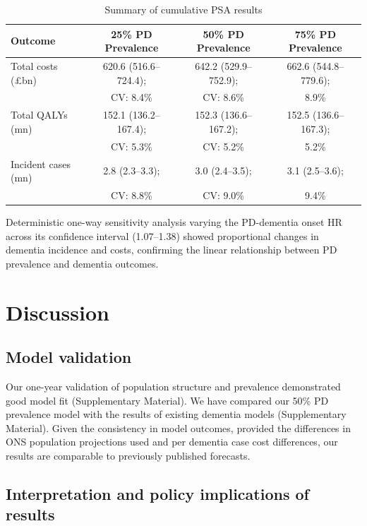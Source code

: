 \documentclass[11pt,a4paper]{article}
\begin{document}
\begin{table}[htbp]
\centering
\caption{Summary of cumulative PSA results}
\label{tab:psa}
\small
\begin{tabular}{lccc}
\toprule
\textbf{Outcome} & \textbf{25\% PD Prevalence} & \textbf{50\% PD Prevalence} & \textbf{75\% PD Prevalence} \\
\midrule
Total costs (\pounds bn) & 620.6 (516.6--724.4); & 642.2 (529.9--752.9); & 662.6 (544.8--779.6); \\
 & CV: 8.4\% & CV: 8.6\% & 8.9\% \\
Total QALYs (mn) & 152.1 (136.2--167.4); & 152.3 (136.6--167.2); & 152.5 (136.6--167.3); \\
 & CV: 5.3\% & CV: 5.2\% & 5.2\% \\
Incident cases (mn) & 2.8 (2.3--3.3); & 3.0 (2.4--3.5); & 3.1 (2.5--3.6); \\
 & CV: 8.8\% & CV: 9.0\% & 9.4\% \\
\bottomrule
\end{tabular}
\end{table}

Deterministic one-way sensitivity analysis varying the PD-dementia onset HR across its confidence interval (1.07--1.38) showed proportional changes in dementia incidence and costs, confirming the linear relationship between PD prevalence and dementia outcomes.

\section{Discussion}

\subsection{Model validation}

Our one-year validation of population structure and prevalence demonstrated good model fit (Supplementary Material). We have compared our 50\% PD prevalence model with the results of existing dementia models (Supplementary Material). Given the consistency in model outcomes, provided the differences in ONS population projections used and per dementia case cost differences, our results are comparable to previously published forecasts.

\subsection{Interpretation and policy implications of results}
\end{document}

